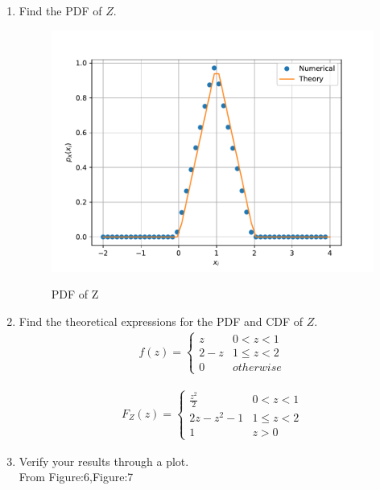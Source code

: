 \documentclass[10pt, a4paper]{article}
\begin{document}
\begin{enumerate}[label=\thesection.\arabic*
,ref=\thesection.\theenumi]
\item Find the PDF of $Z$.
 \begin{figure}[!ht]
\centering
\includegraphics[scale=0.5]{images/5.4_pdf.pdf}
\label{fig_7}
\caption{PDF of Z}
\end{figure}

 
 \begin{center}
\end{center}
\item Find the theoretical expressions for the PDF and CDF of $Z$.
\begin{align}
f(z) = 
\begin{cases}
z & 0 < z < 1  \\
2-z & 1 \le z < 2 \\
0 & otherwise
\end{cases}
\end{align}

\begin{align}
F_Z(z) = 
\begin{cases}
\frac{z^2}{2} & 0 < z < 1  \\
2z-z^2-1 & 1 \le z < 2 \\
1 & z>0
\end{cases}
\end{align}


\item Verify your results through a plot. \\
\solution
 From Figure:6,Figure:7
\end{enumerate}
\end{document}
